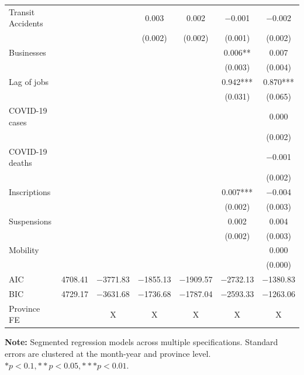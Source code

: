 \documentclass[11pt,a4paper]{article}\usepackage[]{graphicx}\usepackage[]{xcolor}
\begin{document}
\begin{table}[htbp!]
\begin{tabular}[t]{lcccccc}
Transit Accidents &  &  & \num{0.003} & \num{0.002} & \num{-0.001} & \num{-0.002}\\
 &  &  & (\num{0.002}) & (\num{0.002}) & (\num{0.001}) & (\num{0.002})\\
Businesses &  &  &  &  & \num{0.006}** & \num{0.007}\\
 &  &  &  &  & (\num{0.003}) & (\num{0.004})\\
Lag of jobs &  &  &  &  & \num{0.942}*** & \num{0.870}***\\
 &  &  &  &  & (\num{0.031}) & (\num{0.065})\\
COVID-19 cases &  &  &  &  &  & \num{0.000}\\
 &  &  &  &  &  & \vphantom{1} (\num{0.002})\\
COVID-19 deaths &  &  &  &  &  & \num{-0.001}\\
 &  &  &  &  &  & (\num{0.002})\\
Inscriptions &  &  &  &  & \num{0.007}*** & \num{-0.004}\\
 &  &  &  &  & (\num{0.002}) & \vphantom{1} (\num{0.003})\\
Suspensions &  &  &  &  & \num{0.002} & \num{0.004}\\
 &  &  &  &  & (\num{0.002}) & (\num{0.003})\\
Mobility &  &  &  &  &  & \num{0.000}\\
 &  &  &  &  &  & (\num{0.000})\\
\midrule
AIC & \num{4708.41} & \num{-3771.83} & \num{-1855.13} & \num{-1909.57} & \num{-2732.13} & \num{-1380.83}\\
BIC & \num{4729.17} & \num{-3631.68} & \num{-1736.68} & \num{-1787.04} & \num{-2593.33} & \num{-1263.06}\\
Province FE &  & X & X & X & X & X\\
\bottomrule
\end{tabular}


\vspace{0.3cm}
\textbf{Note:} Segmented regression models across multiple specifications. Standard errors are clustered at the month-year and province level.\\
$ *p < 0.1, **p < 0.05, ***p < 0.01.$
\end{table}
\end{document}
